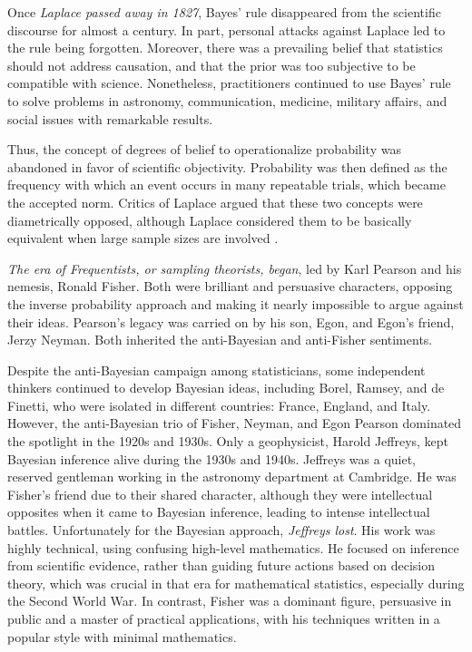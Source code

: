 Once \textit{Laplace passed away in 1827}, Bayes' rule disappeared from the scientific discourse for almost a century. In part, personal attacks against Laplace led to the rule being forgotten. Moreover, there was a prevailing belief that statistics should not address causation, and that the prior was too subjective to be compatible with science. Nonetheless, practitioners continued to use Bayes' rule to solve problems in astronomy, communication, medicine, military affairs, and social issues with remarkable results.

Thus, the concept of degrees of belief to operationalize probability was abandoned in favor of scientific objectivity. Probability was then defined as the frequency with which an event occurs in many repeatable trials, which became the accepted norm. Critics of Laplace argued that these two concepts were diametrically opposed, although Laplace considered them to be basically equivalent when large sample sizes are involved \cite{mcgrayne2011theory}.

\textit{The era of Frequentists, or sampling theorists, began}, led by Karl Pearson and his nemesis, Ronald Fisher. Both were brilliant and persuasive characters, opposing the inverse probability approach and making it nearly impossible to argue against their ideas. Pearson's legacy was carried on by his son, Egon, and Egon’s friend, Jerzy Neyman. Both inherited the anti-Bayesian and anti-Fisher sentiments.

Despite the anti-Bayesian campaign among statisticians, some independent thinkers continued to develop Bayesian ideas, including Borel, Ramsey, and de Finetti, who were isolated in different countries: France, England, and Italy. However, the anti-Bayesian trio of Fisher, Neyman, and Egon Pearson dominated the spotlight in the 1920s and 1930s. Only a geophysicist, Harold Jeffreys, kept Bayesian inference alive during the 1930s and 1940s. Jeffreys was a quiet, reserved gentleman working in the astronomy department at Cambridge. He was Fisher’s friend due to their shared character, although they were intellectual opposites when it came to Bayesian inference, leading to intense intellectual battles. Unfortunately for the Bayesian approach, \textit{Jeffreys lost}. His work was highly technical, using confusing high-level mathematics. He focused on inference from scientific evidence, rather than guiding future actions based on decision theory, which was crucial in that era for mathematical statistics, especially during the Second World War. In contrast, Fisher was a dominant figure, persuasive in public and a master of practical applications, with his techniques written in a popular style with minimal mathematics.

